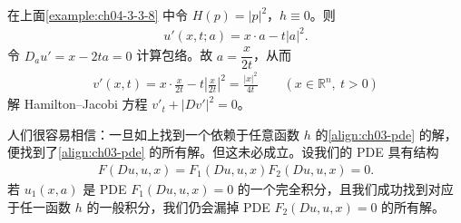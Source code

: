 \documentclass[../../main.tex]{subfiles}
\begin{document}
\begin{example}\label{example:ch03-hj-envelope}
在上面\cref{example:ch04-3-3-8} 中令 $H(p)=|p|^2$，$h\equiv 0$。则
\begin{align*}
u'(x,t;a)=x\cdot a-t|a|^2.
\end{align*}
令 $D_a u'=x-2ta=0$ 计算包络。故 $a=\dfrac{x}{2t}$，从而
\begin{align*}
v'(x,t)=x\cdot\frac{x}{2t}-t\left|\frac{x}{2t}\right|^2=\frac{|x|^2}{4t} \qquad (x\in\mathbb{R}^n,\ t>0)
\end{align*}
解 Hamilton--Jacobi 方程 $v'_t+|Dv'|^2=0$。
\end{example}

\begin{remark}\label{remark:ch03-envelope-all}
人们很容易相信：一旦如上找到一个依赖于任意函数 $h$ 的\eqref{align:ch03-pde} 的解，便找到了\eqref{align:ch03-pde} 的所有解。但这未必成立。设我们的 PDE 具有结构
\begin{align*}
F(Du,u,x)=F_1(Du,u,x)F_2(Du,u,x)=0.
\end{align*}
若 $u_1(x,a)$ 是 PDE $F_1(Du,u,x)=0$ 的一个完全积分，且我们成功找到对应于任一函数 $h$ 的一般积分，我们仍会漏掉 PDE $F_2(Du,u,x)=0$ 的所有解。
\end{remark}
\end{document}
